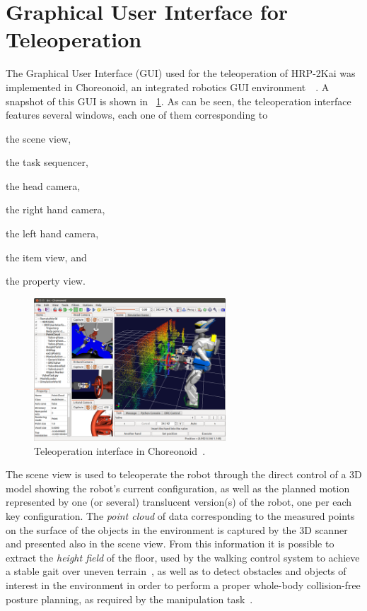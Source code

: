 \section{Graphical User Interface for Teleoperation}
	\label{sec:teleoperation_gui}
	
	The Graphical User Interface (GUI) used for the teleoperation of HRP-2Kai was implemented
	in Choreonoid, an integrated robotics GUI environment~\cite{Choreonoid}~\cite{Nakaoka_Choreonoid}.
	A snapshot of this GUI is shown in \figurename~\ref{fig:Choreonoid3}.
	As can be seen, the teleoperation interface features several windows, each one of them
	corresponding to
	\begin{inparaenum}[(1)]
		\item the scene view,
		\item the task sequencer,
		\item the head camera,
		\item the right hand camera,
		\item the left hand camera,
		\item the item view, and
		\item the property view.
	\end{inparaenum}
		
	\begin{figure}[t]
		\centering
		\includegraphics[height = 5.35cm]{img/Choreonoid3}
		\caption{Teleoperation interface in Choreonoid~\cite{Nakaoka_Humanoids}.}
		\label{fig:Choreonoid3}
	\end{figure}
	
	The scene view is used to teleoperate the robot through the direct control of a 3D model
	showing the robot's current configuration, as well as the planned motion represented by
	one (or several) translucent version(s) of the robot, one per each key configuration.
	The \emph{point cloud} of data corresponding to the measured points on the surface of the
	objects in the environment is captured by the 3D scanner and presented also in the scene view.
	From this information it is possible to extract the \emph{height field} of the floor,
	used by the walking control system to achieve a stable gait over uneven terrain~\cite{Morisawa},
	as well as to detect obstacles and objects of interest in the environment in order to perform
	a proper whole-body collision-free posture planning, as required by the manipulation
	task~\cite{Kanoun}.
	
